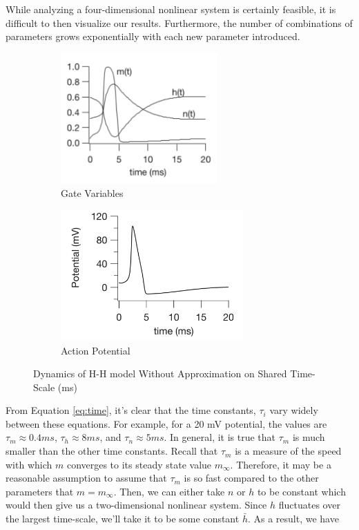 \documentclass[12]{amsbook}
\newcommand\0{\mathbf{0}}
\newcommand\<{\langle}
\renewcommand\>{\rangle}
\begin{document}
While analyzing a four-dimensional nonlinear system is certainly feasible, it is difficult to then visualize our results. Furthermore, the number of combinations of parameters grows exponentially with each new parameter introduced.

\begin{figure}[h]
\centering
\begin{subfigure}{.5\textwidth}
	\centering
	\includegraphics[height=5cm]{keener1.png}
	\caption{Gate Variables}
\end{subfigure}%
\begin{subfigure}{.5\textwidth}
	\centering
	\includegraphics[height=5cm]{keener2.png}
	\caption{Action Potential}
\end{subfigure}
	\caption{Dynamics of H-H model Without Approximation on Shared Time-Scale (ms)}
	\label{fig:keen}
\end{figure}


From Equation \ref{eq:time}, it's clear that the time constants, $\tau_i$ vary widely between these equations. For example, for a 20 mV potential, the values are $\tau_m \approx 0.4 ms$, $\tau_h \approx 8 ms$, and $\tau_n \approx 5 ms$. In general, it is true that $\tau_m$ is much smaller than the other time constants. Recall that $\tau_m$ is a measure of the speed with which $m$ converges to its steady state value $m_\infty$. Therefore, it may be a reasonable assumption to assume that $\tau_m$ is so fast compared to the other parameters that $m = m_\infty$. Then, we can either take $n$ or $h$ to be constant which would then give us a two-dimensional nonlinear system. Since $h$ fluctuates over the largest time-scale, we'll take it to be some constant $\bar{h}$. As a result, we have 
\end{document}
